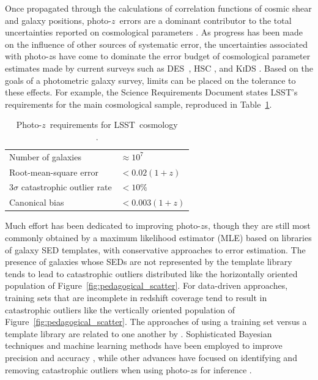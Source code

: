 \documentclass[iop]{emulateapj}
\newcommand{\Fig}[1]{Figure~\ref{#1}}
\newcommand{\project}[1]{\textsc{#1}}
\newcommand{\lsst}{\project{LSST}}
\newcommand{\des}{\project{DES}}
\newcommand{\pz}{photo-$z$}
\newcommand{\Pz}{Photo-$z$}
\begin{document}
Once propagated through the calculations of correlation functions of cosmic shear and galaxy positions, \pz\ errors are a dominant contributor to the total uncertainties reported on cosmological parameters \citep{abruzzo_impact_2019}.
As progress has been made on the influence of other sources of systematic error, the uncertainties associated with \pz s have come to dominate the error budget of cosmological parameter estimates made by current surveys such as \des\ \citep{hoyle_dark_2018}, \project{HSC} \citep{tanaka_photometric_2018}, and \project{KiDS} \citep{hildebrandt_kids-450:_2017}.
Based on the goals of a photometric galaxy survey, limits can be placed on the tolerance to these effects.
For example, the Science Requirements Document \citep{mandelbaum_weak_2017} states \lsst's requirements for the main cosmological sample, reproduced in Table~\ref{tab:lsstsrd}.

\begin{table}
	\begin{center}
		\caption{\Pz\ requirements for \lsst\ cosmology\\
				\citep{mandelbaum_weak_2017}.}
		\begin{tabular}{ll}
			Number of galaxies & $\approx 10^{7}$\\
			Root-mean-square error & $< 0.02 (1 + z)$\\
			$3 \sigma$ catastrophic outlier rate & $< 10\%$\\
			Canonical bias & $< 0.003 (1 + z)$\\
		\end{tabular}
		\label{tab:lsstsrd}
	\end{center}
\end{table}

Much effort has been dedicated to improving \pz s, though they are still most commonly obtained by a maximum likelihood estimator (MLE) based on libraries of galaxy SED templates, with conservative approaches to error estimation.
The presence of galaxies whose SEDs are not represented by the template library tends to lead to catastrophic outliers distributed like the horizontally oriented population of \Fig{fig:pedagogical_scatter}.
For data-driven approaches, training sets that are incomplete in redshift coverage tend to result in catastrophic outliers like the vertically oriented population of \Fig{fig:pedagogical_scatter}.
The approaches of using a training set versus a template library are related to one another by \citet{budavari_unified_2009}.
Sophisticated Bayesian techniques and machine learning methods have been employed to improve precision \citep{carliles_random_2010} and accuracy \citep{sadeh_annz2:_2016}, while other advances have focused on identifying and removing catastrophic outliers when using \pz s for inference \citep{gorecki_new_2014}.
\end{document}
